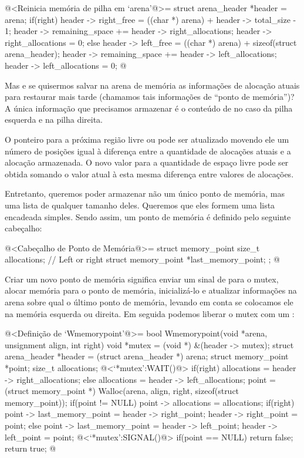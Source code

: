 \iniciocodigo
@<Reinicia memória de pilha em `arena'@>=
{
  struct arena_header *header = arena;
  if(right){
    header -> right_free = ((char *) arena) + header -> total_size - 1;
    header -> remaining_space += header -> right_allocations;
    header -> right_allocations = 0;
  }
  else{
    header -> left_free = ((char *) arena) + sizeof(struct arena_header);
    header -> remaining_space += header -> left_allocations;
    header -> left_allocations = 0;
  }
}
@
\fimcodigo

Mas e se quisermos salvar na arena de memória as informações de
alocação atuais para restaurar mais tarde (chamamos tais informações
de ``ponto de memória'')? A única informação que precisamos armazenar
é o conteúdo de  no caso da pilha
esquerda e  na pilha direita.

O ponteiro para a próxima região livre 
ou  pode ser atualizado movendo ele um número
de posições igual à diferença entre a quantidade de alocações atuais e
a alocação armazenada. O novo valor para a quantidade de espaço livre
pode ser obtida somando o valor atual à esta mesma diferença entre
valores de alocações.

Entretanto, queremos poder armazenar não um único ponto de memória,
mas uma lista de qualquer tamanho deles. Queremos que eles formem uma
lista encadeada simples. Sendo assim, um ponto de memória é definido
pelo seguinte cabeçalho:

\iniciocodigo
@<Cabeçalho de Ponto de Memória@>=
struct memory_point{
  size_t allocations; // Left or right
  struct memory_point *last_memory_point;
};
@
\fimcodigo


Criar um novo ponto de memória significa enviar um sinal
de  para o mutex, alocar memória para o ponto de
memória, inicializá-lo e atualizar informações na arena sobre qual o
último ponto de memória, levando em conta se colocamos ele na memória
esquerda ou direita. Em seguida podemos liberar o mutex com
um :

\iniciocodigo
@<Definição de `Wmemorypoint'@>=
bool Wmemorypoint(void *arena, unsignment align, int right){
  void *mutex = (void *) &(header -> mutex);
  struct arena_header *header = (struct arena_header *) arena;
  struct memory_point *point;
  size_t allocations;
  @<`*mutex':WAIT()@>
  if(right)
    allocations = header -> right_allocations;
  else
    allocations = header -> left_allocations;
  point = (struct memory_point *) Walloc(arena, align, right,
                                         sizeof(struct memory_point));
  if(point != NULL){
    point -> allocations = allocations;
    if(right){
      point -> last_memory_point = header -> right_point;
      header -> right_point = point;
    }
    else{
      point -> last_memory_point = header -> left_point;
      header -> left_point = point;
    }
  }
  @<`*mutex':SIGNAL()@>
  if(point == NULL)
    return false;
  return true;
}
@
\fimcodigo




